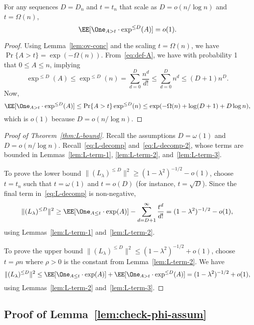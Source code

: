 \documentclass[11pt]{article}
\begin{document}
\begin{lemma}\label{lem:L-term-3}
For any sequences $D = D_n$ and $t = t_n$ that scale as $D = o(n/\log n)$ and $t = \Omega(n)$,
\[ \EE[\One_{A > t} \cdot \exp^{\le D}(A)] = o(1). \]
\end{lemma}
\begin{proof}
Using Lemma~\ref{lem:ov-conc} and the scaling $t = \Omega(n)$, we have $\Pr\{A > t\} = \exp(-\Omega(n))$. From~\eqref{eq:def-A}, we have with probability 1 that $0 \le A \le n$, implying
\[ \exp^{\le D}(A) \le \exp^{\le D}(n) = \sum_{d=0}^D \frac{n^d}{d!} \le \sum_{d=0}^D n^d \le (D+1)n^D. \]
Now,
\[ \EE[\One_{A > t} \cdot \exp^{\le D}(A)] \le \Pr\{A > t\} \exp^{\le D}(n) \le \exp(-\Omega(n) + \log(D+1) + D \log n), \]
which is $o(1)$ because $D = o(n/\log n)$.
\end{proof}

\begin{proof}[Proof of Theorem~\ref{thm:L-bound}]
Recall the assumptions $D = \omega(1)$ and $D = o(n/\log n)$. Recall~\eqref{eq:L-decomp} and~\eqref{eq:L-decomp-2}, whose terms are bounded in Lemmas~\ref{lem:L-term-1}, \ref{lem:L-term-2}, and~\ref{lem:L-term-3}.

To prove the lower bound $\|(L_\lambda)^{\le D}\|^2 \ge (1-\lambda^2)^{-1/2} - o(1)$, choose $t = t_n$ such that $t = \omega(1)$ and $t = o(D)$ (for instance, $t = \sqrt{D}$). Since the final term in~\eqref{eq:L-decomp} is non-negative,
\[ \|(L_\lambda)^{\le D}\|^2 \ge \EE[\One_{A \le t} \cdot \exp(A)] - \sum_{d=D+1}^\infty \frac{t^d}{d!} = (1-\lambda^2)^{-1/2} - o(1), \]
using Lemmas~\ref{lem:L-term-1} and~\ref{lem:L-term-2}.

To prove the upper bound $\|(L_\lambda)^{\le D}\|^2 \le (1-\lambda^2)^{-1/2} + o(1)$, choose $t = \rho n$ where $\rho > 0$ is the constant from Lemma~\ref{lem:L-term-2}. We have
\[ \|(L_\lambda)^{\le D}\|^2 \le \EE[\One_{A \le t} \cdot \exp(A)] + \EE[\One_{A > t} \cdot \exp^{\le D}(A)] = (1-\lambda^2)^{-1/2} + o(1), \]
using Lemmas~\ref{lem:L-term-2} and~\ref{lem:L-term-3}.
\end{proof}




\subsection{Proof of Lemma~\ref{lem:check-phi-assum}}
\end{document}
